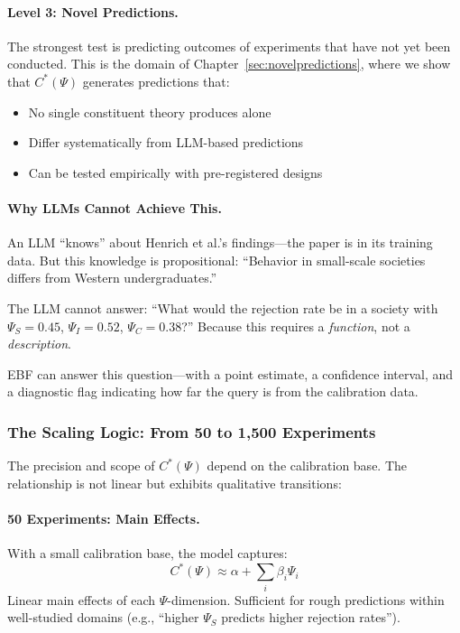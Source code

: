 \paragraph{Level 3: Novel Predictions.}
The strongest test is predicting outcomes of experiments that have not yet
been conducted. This is the domain of Chapter~\ref{sec:novelpredictions},
where we show that $C^*(\Psi)$ generates predictions that:
\begin{itemize}
    \item No single constituent theory produces alone
    \item Differ systematically from LLM-based predictions
    \item Can be tested empirically with pre-registered designs
\end{itemize}

\paragraph{Why LLMs Cannot Achieve This.}
An LLM ``knows'' about Henrich et al.'s findings---the paper is in its
training data. But this knowledge is propositional: ``Behavior in small-scale
societies differs from Western undergraduates.''

The LLM cannot answer: ``What would the rejection rate be in a society with
$\Psi_S = 0.45$, $\Psi_I = 0.52$, $\Psi_C = 0.38$?'' Because this requires a
\emph{function}, not a \emph{description}.

EBF can answer this question---with a point estimate, a confidence
interval, and a diagnostic flag indicating how far the query is from the
calibration data.


\subsubsection{The Scaling Logic: From 50 to 1,500 Experiments}

The precision and scope of $C^*(\Psi)$ depend on the calibration base.
The relationship is not linear but exhibits qualitative transitions:

\paragraph{50 Experiments: Main Effects.}
With a small calibration base, the model captures:
\begin{equation}
    C^*(\Psi) \approx \alpha + \sum_i \beta_i \Psi_i
\end{equation}
Linear main effects of each $\Psi$-dimension. Sufficient for rough predictions
within well-studied domains (e.g., ``higher $\Psi_S$ predicts higher rejection
rates'').

